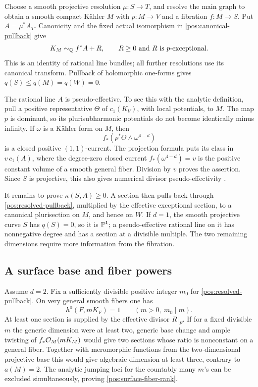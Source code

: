 Choose a smooth projective resolution \(\mu:S\to T\), and resolve
the main graph to obtain a smooth compact Kähler \(M\) with
\(p:M\to V\) and a fibration \(f:M\to S\). Put \(A=\mu^*A_T\).
Canonicity and the fixed actual isomorphism in
\eqref{pos:canonical-pullback} give
\begin{equation}\label{pos:resolved-pullback}
 K_M\sim_{\mathbb{Q}}f^*A+R,
 \qquad R\geq0\text{ and }R\text{ is }p\text{-exceptional}.
\end{equation}
This is an identity of rational line bundles; all further resolutions
use its canonical transform. Pullback of holomorphic one-forms gives
\(q(S)\leq q(M)=q(W)=0\).

The rational line \(A\) is pseudo-effective. To see this with the
analytic definition, pull a positive representative \(\Theta\) of
\(c_1(K_V)\), with local potentials, to \(M\). The map \(p\) is
dominant, so its plurisubharmonic potentials do not become identically
minus infinity. If \(\omega\) is a Kähler form on \(M\), then
\[
 f_*(p^*\Theta\wedge\omega^{4-d})
\]
is a closed positive \((1,1)\)-current. The projection formula puts its
class in \(v\,c_1(A)\), where the degree-zero closed current
\(f_*(\omega^{4-d})=v\) is the positive constant volume of a smooth
general fiber. Division by \(v\) proves the assertion. Since \(S\)
is projective, this also gives numerical divisor pseudo-effectivity
\cite{BDPP}.

It remains to prove \(\kappa(S,A)\geq0\). A section then pulls back
through \eqref{pos:resolved-pullback}, multiplied by the effective
exceptional section, to a canonical plurisection on \(M\), and hence
on \(W\). If \(d=1\), the smooth projective curve \(S\) has
\(q(S)=0\), so it is \(\mathbb{P}^1\); a pseudo-effective rational line on
it has nonnegative degree and has a section at a divisible multiple.
The two remaining dimensions require more information from the
fibration.

\subsection{A surface base and fiber powers}

Assume \(d=2\). Fix a sufficiently divisible positive integer \(m_0\)
for \eqref{pos:resolved-pullback}. On very general smooth fibers one
has
\begin{equation}\label{pos:surface-fiber-rank}
 h^0(F,mK_F)=1\qquad(m>0,\ m_0\mid m).
\end{equation}
At least one section is supplied by the effective divisor \(R|_F\).
If for a fixed divisible \(m\) the generic dimension were at least
two, generic base change and ample twisting of
\(f_*\mathcal{O}_M(mK_M)\) would give two sections whose ratio is nonconstant
on a general fiber. Together with meromorphic functions from the
two-dimensional projective base this would give algebraic dimension
at least three, contrary to \(a(M)=2\). The analytic jumping loci
for the countably many \(m\)'s can be excluded simultaneously, proving
\eqref{pos:surface-fiber-rank}.

